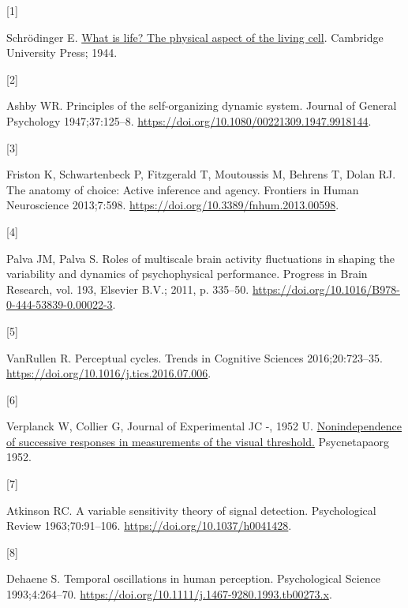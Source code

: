 \documentclass[
]{article}
\newlength{\cslhangindent}
\newlength{\csllabelwidth}
\newlength{\cslentryspacingunit} %
\newenvironment{CSLReferences}[2] %
 {%
  \setlength{\parindent}{0pt}
  \ifodd #1
  \let\oldpar\par
  \def\par{\hangindent=\cslhangindent\oldpar}
  \fi
  \setlength{\parskip}{#2\cslentryspacingunit}
 }%
 {}
\newcommand{\CSLLeftMargin}[1]{\parbox[t]{\csllabelwidth}{#1}}
\newcommand{\CSLRightInline}[1]{\parbox[t]{\linewidth - \csllabelwidth}{#1}\break}
\begin{document}
\hypertarget{refs}{}
\begin{CSLReferences}{0}{0}
\leavevmode{}%
\CSLLeftMargin{{[}1{]} }%
\CSLRightInline{Schrödinger E.
\href{http://filf.pskgu.ru/ebooks/schbio/schbio_titul.pdf}{What is life?
The physical aspect of the living cell}. Cambridge University Press;
1944.}

\leavevmode{}%
\CSLLeftMargin{{[}2{]} }%
\CSLRightInline{Ashby WR. Principles of the self-organizing dynamic
system. Journal of General Psychology 1947;37:125--8.
\url{https://doi.org/10.1080/00221309.1947.9918144}.}

\leavevmode{}%
\CSLLeftMargin{{[}3{]} }%
\CSLRightInline{Friston K, Schwartenbeck P, Fitzgerald T, Moutoussis M,
Behrens T, Dolan RJ. The anatomy of choice: Active inference and agency.
Frontiers in Human Neuroscience 2013;7:598.
\url{https://doi.org/10.3389/fnhum.2013.00598}.}

\leavevmode{}%
\CSLLeftMargin{{[}4{]} }%
\CSLRightInline{Palva JM, Palva S. Roles of multiscale brain activity
fluctuations in shaping the variability and dynamics of psychophysical
performance. Progress in Brain Research, vol. 193, Elsevier B.V.; 2011,
p. 335--50. \url{https://doi.org/10.1016/B978-0-444-53839-0.00022-3}.}

\leavevmode{}%
\CSLLeftMargin{{[}5{]} }%
\CSLRightInline{VanRullen R. Perceptual cycles. Trends in Cognitive
Sciences 2016;20:723--35.
\url{https://doi.org/10.1016/j.tics.2016.07.006}.}

\leavevmode{}%
\CSLLeftMargin{{[}6{]} }%
\CSLRightInline{Verplanck W, Collier G, Journal of Experimental JC -,
1952 U.
\href{https://psycnet.apa.org/record/1953-04864-001}{Nonindependence of
successive responses in measurements of the visual threshold.}
Psycnetapaorg 1952.}

\leavevmode{}%
\CSLLeftMargin{{[}7{]} }%
\CSLRightInline{Atkinson RC. A variable sensitivity theory of signal
detection. Psychological Review 1963;70:91--106.
\url{https://doi.org/10.1037/h0041428}.}

\leavevmode{}%
\CSLLeftMargin{{[}8{]} }%
\CSLRightInline{Dehaene S. Temporal oscillations in human perception.
Psychological Science 1993;4:264--70.
\url{https://doi.org/10.1111/j.1467-9280.1993.tb00273.x}.}


\end{CSLReferences}
\end{document}
